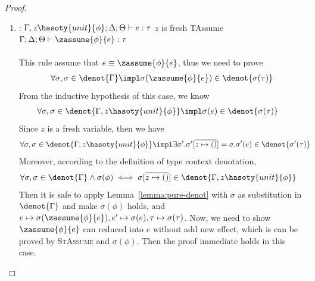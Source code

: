 \begin{proof}
\begin{enumerate}[label=Case]
\item:
{\footnotesize
\mprooftr{50mm}
{$\Gamma, z\hasoty{unit}{\phi};\Delta;\Theta \vdash e : \tau$ \quad $z$ is fresh}
{TAssume}
{$\Gamma;\Delta;\Theta  \vdash \zassume{\phi}{e} : \tau  $}
\ \\ \ \\}
This rule assume that $e \equiv \zassume{\phi}{e}$, thus we need to prove
{\footnotesize\begin{align*}
    \forall \sigma, \sigma \in \denot{\Gamma} \impl \sigma(\zassume{\phi}{e}) \in \denot{\sigma(\tau)}
\end{align*}}\noindent
From the inductive hypothesis of this case, we know
{\footnotesize\begin{align*}
    &\forall \sigma, \sigma \in \denot{\Gamma, z\hasoty{unit}{\phi}} \impl \sigma(e) \in \denot{\sigma(\tau)}
\end{align*}}\noindent
Since $z$ is a fresh variable, then we have
{\footnotesize\begin{align*}
    &\forall \sigma, \sigma \in \denot{\Gamma, z\hasoty{unit}{\phi}} \impl \exists \sigma'. \sigma'[\overline{z \mapsto ()}] = \sigma. \sigma'(e) \in \denot{\sigma'(\tau)}
\end{align*}}\noindent
Moreover, according to the definition of type context denotation, 
{\footnotesize\begin{align*}
    &\forall \sigma, \sigma \in \denot{\Gamma} \land \sigma(\phi) \iff \sigma[\overline{z \mapsto ()}] \in \denot{\Gamma, z\hasoty{unit}{\phi}}
\end{align*}}\noindent
Then it is safe to apply Lemma~\ref{lemma:pure-denot} with $\sigma$ as substitution in $\denot{\Gamma}$ and make $\sigma(\phi)$ holds, and $e \mapsto \sigma(\zassume{\phi}{e}), e' \mapsto \sigma(e), \tau \mapsto \sigma(\tau)$.
Now, we need to show $\zassume{\phi}{e}$ can reduced into $e$ without add new effect, which is can be proved by \textsc{StAssume} and $\sigma(\phi)$. Then the proof immediate holds in this case.


\end{enumerate}
\end{proof}
